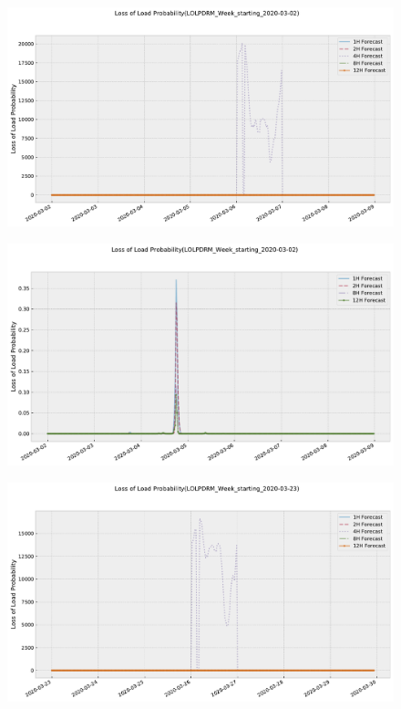 \documentclass[energies,article,submit,moreauthors,pdftex]{Definitions/mdpi}
\begin{document}
\begin{figure}[H]\centering
\hspace{-25pt}\includegraphics[width=15 cm]{Graphics/LOLPDRM_Week_starting_2020-03-02.pdf}
\caption{}\label{}
\end{figure}  
\begin{figure}[H]\centering
\hspace{-25pt}\includegraphics[width=15 cm]{Graphics/LOLPDRM_Week_starting_2020-03-02no4H.pdf}
\caption{}\label{}
\end{figure}  
\begin{figure}[H]\centering
\hspace{-25pt}\includegraphics[width=15 cm]{Graphics/LOLPDRM_Week_starting_2020-03-23.pdf}
\caption{}\label{}
\end{figure}  
\end{document}
